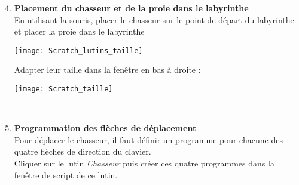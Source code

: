       \begin{enumerate}
      \setcounter{enumi}{3}
         \item {\bf Placement du chasseur et de la proie dans le labyrinthe} \pfh{} \\
         En utilisant la souris, placer le chasseur sur le point de départ du labyrinthe et placer la proie dans le labyrinthe \parbox{2.5cm}{\texttt{[image: Scratch\_lutins\_taille]}} Adapter leur \textcolor{B1}{taille} dans la fenêtre en bas à droite : \parbox{3cm}{\texttt{[image: Scratch\_taille]}} \\ \medskip
   
         \item {\bf Programmation des flèches de déplacement} \pfh{} \\
      Pour déplacer le chasseur, il faut définir un programme pour chacune des quatre flèches de direction du clavier. \\
      Cliquer sur le lutin {\it Chasseur} puis créer ces quatre programmes dans la fenêtre de script de ce lutin. \\
         \begin{center}
            \begin{scratch}
            \end{scratch}
   
            \begin{minipage}{7cm}
               \begin{scratch}
               \end{scratch}
            \end{minipage}
            \hfill
            \begin{minipage}{7cm}
               \begin{scratch}
               \end{scratch}
            \end{minipage}
   

\end{center}
\end{enumerate}
